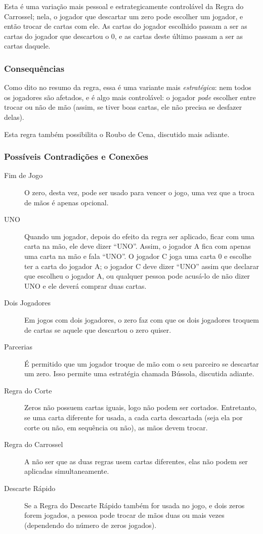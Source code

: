 Esta é uma variação mais pessoal e estrategicamente controlável da Regra do Carrossel; nela, o jogador que descartar um zero pode escolher um jogador, e então trocar de cartas com ele. As cartas do jogador escolhido passam a ser as cartas do jogador que descartou o 0, e as cartas deste último passam a ser as cartas daquele.

\subsubsection{Consequências}

Como dito no resumo da regra, essa é uma variante mais \emph{estratégica}: nem todos os jogadores são afetados, e é algo mais controlável: o jogador \emph{pode} escolher entre trocar ou não de mão (assim, se tiver boas cartas, ele não precisa se desfazer delas).

Esta regra também possibilita o Roubo de Cena, discutido mais adiante.

\subsubsection{Possíveis Contradições e Conexões}

\begin{description}
\item[Fim de Jogo]{O zero, desta vez, pode ser usado para vencer o jogo, uma vez que a troca de mãos é apenas opcional.}
\item[UNO]{Quando um jogador, depois do efeito da regra ser aplicado, ficar com uma carta na mão, ele deve dizer ``UNO''. Assim, o jogador A fica com apenas uma carta na mão e fala ``UNO''. O jogador C joga uma carta 0 e escolhe ter a carta do jogador A; o jogador C deve dizer ``UNO'' assim que declarar que escolheu o jogador A, ou qualquer pessoa pode acusá-lo de não dizer UNO e ele deverá comprar duas cartas.}
\item[Dois Jogadores]{Em jogos com dois jogadores, o zero faz com que os dois jogadores troquem de cartas se aquele que descartou o zero quiser.}
\item[Parcerias]{É permitido que um jogador troque de mão com o seu parceiro se descartar um zero. Isso permite uma estratégia chamada Bússola, discutida adiante.}
\item[Regra do Corte]{Zeros não possuem cartas iguais, logo não podem ser cortados. Entretanto, se uma carta diferente for usada, a cada carta descartada (seja ela por corte ou não, em sequência ou não), as mãos devem trocar.}
\item[Regra do Carrossel]{A não ser que as duas regras usem cartas diferentes, elas não podem ser aplicadas simultaneamente.}
\item[Descarte Rápido]{Se a Regra do Descarte Rápido também for usada no jogo, e dois zeros forem jogados, a pessoa pode trocar de mãos duas ou mais vezes (dependendo do número de zeros jogados).}
\end{description}

